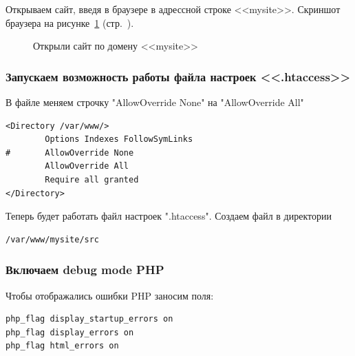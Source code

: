 Открываем сайт, введя в браузере в адрессной строке <<mysite>>.
Скриншот браузера на рисунке~\ref{fig:browser-mysite} (стр.~\pageref{fig:browser-mysite}).

\begin{figure}[tp]
    \caption{Открыли сайт по домену <<mysite>>}
    \label{fig:browser-mysite}
\end{figure}

\newpage


\subsubsection*{Запускаем возможность работы файла настроек <<.htaccess>>}

В файле меняем строчку "AllowOverride None" на "AllowOverride All"

\begin{verbatim}
<Directory /var/www/>
        Options Indexes FollowSymLinks
#       AllowOverride None
        AllowOverride All
        Require all granted
</Directory>
\end{verbatim}

Теперь будет работать файл настроек ".htaccess". Создаем файл в директории

\begin{verbatim}
/var/www/mysite/src
\end{verbatim}

\subsubsection*{Включаем debug mode PHP}

Чтобы отображались ошибки PHP заносим поля:

\begin{verbatim}
php_flag display_startup_errors on
php_flag display_errors on
php_flag html_errors on
\end{verbatim}

